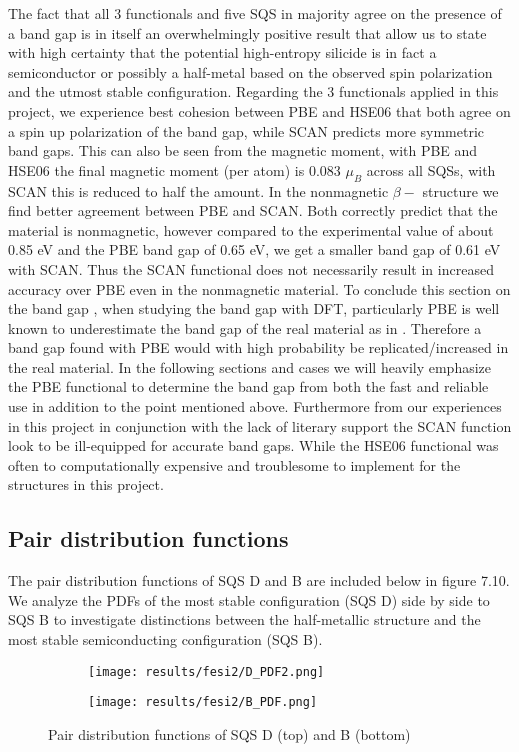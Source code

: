 The fact that all 3 functionals and five SQS in majority agree on the presence of a band gap is in itself an overwhelmingly positive result that allow us to state with high certainty that the potential high-entropy silicide  is in fact a semiconductor or possibly a half-metal based on the observed spin polarization and the utmost stable configuration. Regarding the 3 functionals applied in this project, we experience best cohesion between PBE and HSE06 that both agree on a spin up polarization of the band gap, while SCAN predicts more symmetric band gaps. This can also be seen from the magnetic moment, with PBE and HSE06 the final magnetic moment (per atom) is 0.083 $\mu_B$ across all SQSs, with SCAN this is reduced to half the amount. In the nonmagnetic $\beta-$  structure we find better agreement between PBE and SCAN. Both correctly predict that the material is nonmagnetic, however compared to the experimental value of about 0.85 eV and the PBE band gap of 0.65 eV, we get a smaller band gap of 0.61 eV with SCAN. Thus the SCAN functional does not necessarily result in increased accuracy over PBE even in the nonmagnetic material. To conclude this section on the band gap , when studying the band gap with DFT, particularly PBE is well known to underestimate the band gap of the real material as in . Therefore a band gap found with PBE would with high probability be replicated/increased in the real material. In the following sections and cases we will heavily emphasize the PBE functional to determine the band gap from both the fast and reliable use in addition to the point mentioned above. Furthermore from our experiences in this project in conjunction with the lack of literary support the SCAN function look to be ill-equipped for accurate band gaps. While the HSE06 functional was often to computationally expensive and troublesome to implement for the structures in this project.
 
\subsection{Pair distribution functions}
The pair distribution functions of SQS D and B are included below in figure 7.10. We analyze the PDFs of the most stable configuration (SQS D) side by side to SQS B to investigate distinctions between the half-metallic structure and the most stable semiconducting configuration (SQS B). 
 
\begin{figure}[H]
	\centering
	\begin{subfigure}{\textwidth}
		\texttt{[image: results/fesi2/D\_PDF2.png]}
	\end{subfigure}
	\begin{subfigure}{\textwidth}
		\texttt{[image: results/fesi2/B\_PDF.png]}
	\end{subfigure}
	\caption{Pair distribution functions of SQS D (top) and B (bottom)}
\end{figure}

